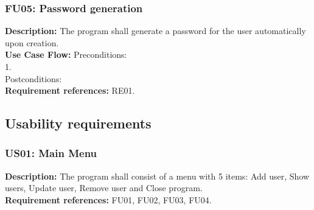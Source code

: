 \begin{adjustwidth}{2em}{0pt}
    \subsubsection*{FU05: Password generation}
    \begin{adjustwidth}{1em}{0pt}
        \textbf{Description:}
        The program shall generate a password for the user automatically upon creation.\\
        \noindent\textbf{Use Case Flow:}
        Preconditions: \\
        1. \\
        Postconditions: \\
        \textbf{Requirement references:}
        RE01.
    \end{adjustwidth}
    
\end{adjustwidth}

\subsection{Usability requirements}
\begin{adjustwidth}{2em}{0pt}

    \subsubsection*{US01: Main Menu}
    \begin{adjustwidth}{1em}{0pt}
        \textbf{Description:}
        The program shall consist of a menu with 5 items: Add user, Show users, Update user, Remove user and Close program.\\
        \textbf{Requirement references:}
        FU01, FU02, FU03, FU04.
    \end{adjustwidth}
    
\end{adjustwidth}

